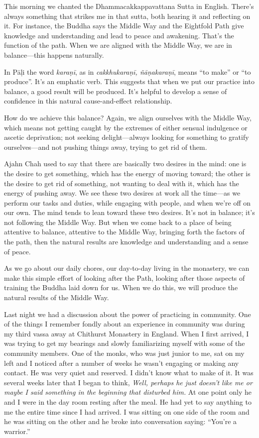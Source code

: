 This morning we chanted the Dhammacakkappavattana Sutta in English. 
There's always something that strikes me in that sutta, both hearing it 
and reflecting on it. For instance, the Buddha says the Middle Way and 
the Eightfold Path give knowledge and understanding and lead to peace 
and awakening. That's the function of the path. When we are aligned 
with the Middle Way, we are in balance---this happens naturally.

In Pāḷi the word \emph{karaṇī}, as in \emph{cakkhukaraṇī, 
ñāṇakaraṇī}, means ``to make'' or ``to produce''. It's an 
emphatic verb. This suggests that when we put our practice into 
balance, a good result will be produced. It's helpful to develop a 
sense of confidence in this natural cause-and-effect relationship.

How do we achieve this balance? Again, we align ourselves with the 
Middle Way, which means not getting caught by the extremes of either 
sensual indulgence or ascetic deprivation; not seeking delight---always 
looking for something to gratify ourselves---and not pushing things 
away, trying to get rid of them.

Ajahn Chah used to say that there are basically two desires in the 
mind: one is the desire to get something, which has the energy of 
moving toward; the other is the desire to get rid of something, not 
wanting to deal with it, which has the energy of pushing away. We see 
these two desires at work all the time---as we perform our tasks and 
duties, while engaging with people, and when we're off on our own. The 
mind tends to lean toward these two desires. It's not in balance; it's 
not following the Middle Way. But when we come back to a place of being 
attentive to balance, attentive to the Middle Way, bringing forth the 
factors of the path, then the natural results are knowledge and 
understanding and a sense of peace.

As we go about our daily chores, our day-to-day living in the 
monastery, we can make this simple effort of looking after the Path, 
looking after those aspects of training the Buddha laid down for us. 
When we do this, we will produce the natural results of the Middle Way.


Last night we had a discussion about the power of practicing in 
community. One of the things I remember fondly about an experience in 
community was during my third vassa away at Chithurst Monastery in 
England. When I first arrived, I was trying to get my bearings and 
slowly familiarizing myself with some of the community members. One of 
the monks, who was just junior to me, sat on my left and I noticed 
after a number of weeks he wasn't engaging or making any contact. He 
was very quiet and reserved. I didn't know what to make of it. It was 
several weeks later that I began to think, \emph{Well, perhaps he just 
doesn't like me or maybe I said something in the beginning that 
disturbed him.} At one point only he and I were in the day room resting 
after the meal. He had yet to say anything to me the entire time since 
I had arrived. I was sitting on one side of the room and he was sitting 
on the other and he broke into conversation saying: ``You're a 
warrior.''

